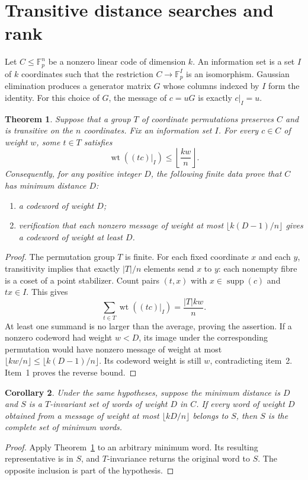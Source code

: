 \documentclass[11pt,a4paper]{article}
\newtheorem{theorem}{Theorem}[section]
\newtheorem{corollary}[theorem]{Corollary}
\numberwithin{equation}{section}
\newcommand{\wt}{\operatorname{wt}}
\begin{document}
\section{Transitive distance searches and rank}

Let $C\leq \mathbb F_p^n$ be a nonzero linear code of dimension $k$.
An information set is a set $I$ of $k$ coordinates such that the restriction
$C\longrightarrow\mathbb F_p^I$ is an isomorphism. Gaussian elimination
produces a generator matrix $G$ whose columns indexed by $I$ form the identity.
For this choice of $G$, the message of $c=uG$ is exactly $c|_I=u$.

\begin{theorem}\label{ULCD.TransitiveDistance}
Suppose that a group $T$ of coordinate permutations preserves $C$ and is
transitive on the $n$ coordinates. Fix an information set $I$. For every
$c\in C$ of weight $w$, some $t\in T$ satisfies
\[
 \wt((tc)|_I)\leq\left\lfloor\frac{kw}{n}\right\rfloor.
\]
Consequently, for any positive integer $D$, the following finite data prove
that $C$ has minimum distance $D$:
\begin{enumerate}
\item a codeword of weight $D$;
\item verification that each nonzero message of weight at most
$\lfloor k(D-1)/n\rfloor$ gives a codeword of weight at least $D$.
\end{enumerate}
\end{theorem}
\begin{proof}
The permutation group $T$ is finite. For each fixed coordinate $x$ and each
$y$, transitivity implies that exactly $|T|/n$ elements send $x$ to $y$:
each nonempty fibre is a coset of a point stabilizer. Count pairs $(t,x)$
with $x\in\operatorname{supp}(c)$ and $tx\in I$. This gives
\[
 \sum_{t\in T}\wt((tc)|_I)=\frac{|T|kw}{n}.
\]
At least one summand is no larger than the average, proving the assertion.
If a nonzero codeword had weight $w<D$, its image under the corresponding
permutation would have nonzero message of weight at most
$\lfloor kw/n\rfloor\leq\lfloor k(D-1)/n\rfloor$. Its codeword weight is
still $w$, contradicting item~2. Item~1 proves the reverse bound.
\end{proof}

\begin{corollary}\label{ULCD.MinimumEnumeration}
Under the same hypotheses, suppose the minimum distance is $D$ and $S$ is
a $T$-invariant set of words of weight $D$ in $C$. If every word of weight
$D$ obtained from a message of weight at most $\lfloor kD/n\rfloor$
belongs to $S$, then $S$ is the complete set of minimum words.
\end{corollary}
\begin{proof}
Apply Theorem~\ref{ULCD.TransitiveDistance} to an arbitrary minimum word. Its resulting
representative is in $S$, and $T$-invariance returns the original word to $S$.
The opposite inclusion is part of the hypothesis.
\end{proof}
\end{document}
